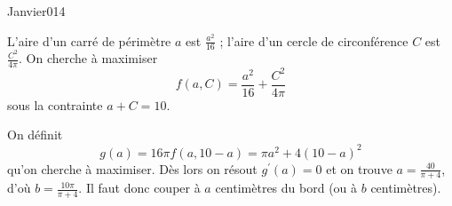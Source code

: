 \begin{corrige}{Janvier014}


L'aire d'un carré de périmètre $a$ est $\frac{a^2}{16}$ ; l'aire d'un cercle de
circonférence $C$ est $\frac{C^2}{4\pi}$. On cherche à maximiser
\begin{equation*}
f(a,C) = \frac{a^2}{16} + \frac{C^2}{4\pi}
\end{equation*}
sous la contrainte $a + C = 10$.

On définit
\begin{equation*}
  g(a) = 16 \pi f(a,10-a) = \pi a^2 + 4(10-a)^2
\end{equation*}
qu'on cherche à maximiser. Dès lors on résout $g^\prime(a) = 0$ et on
trouve $a = \frac{40}{\pi+4}$, d'où $b = \frac{10\pi}{\pi+4}$. Il faut
donc couper à $a$ centimètres du bord (ou à $b$ centimètres).



\end{corrige}
